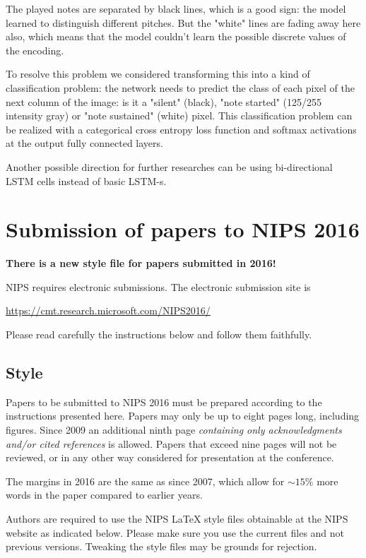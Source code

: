 \documentclass{article}
\begin{document}
The played notes are separated by black lines, which is a good sign: the model learned to distinguish different pitches. But the "white" lines are fading away here also, which means that the model couldn't learn the possible discrete values of the encoding. 

To resolve this problem we considered transforming this into a kind of classification problem: the network needs to predict the class of each pixel of the next column of the image: is it a "silent" (black), "note started" (125/255 intensity gray) or "note sustained" (white) pixel. This classification problem can be realized with a categorical cross entropy loss function and softmax activations at the output fully connected layers. 

Another possible direction for further researches can be using bi-directional LSTM cells instead of basic LSTM-s. 


\section{Submission of papers to NIPS 2016}

\textbf{There is a new style file for papers submitted in 2016!}

NIPS requires electronic submissions.  The electronic submission site
is
\begin{center}
  \url{https://cmt.research.microsoft.com/NIPS2016/}
\end{center}

Please read carefully the instructions below and follow them
faithfully.

\subsection{Style}

Papers to be submitted to NIPS 2016 must be prepared according to the
instructions presented here. Papers may only be up to eight pages
long, including figures. Since 2009 an additional ninth page
\emph{containing only acknowledgments and/or cited references} is
allowed. Papers that exceed nine pages will not be reviewed, or in any
other way considered for presentation at the conference.

The margins in 2016 are the same as since 2007, which allow for
$\sim$$15\%$ more words in the paper compared to earlier years.

Authors are required to use the NIPS \LaTeX{} style files obtainable
at the NIPS website as indicated below. Please make sure you use the
current files and not previous versions. Tweaking the style files may
be grounds for rejection.
\end{document}
